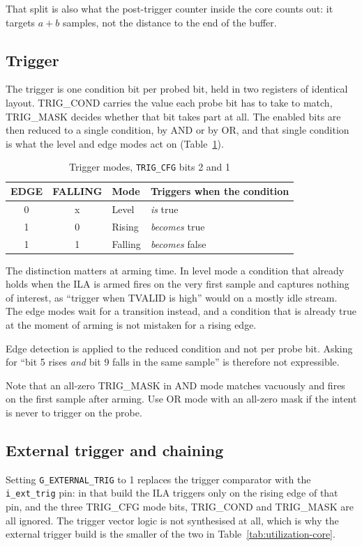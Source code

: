 \documentclass[twocolumn]{article}
\begin{document}
That split is also what the post-trigger counter inside the core counts out: it targets $a + b$ samples, not the distance to the end of the buffer.

\subsection{Trigger}
The trigger is one condition bit per probed bit, held in two registers of identical layout. TRIG\_COND carries the value each probe bit has to take to match, TRIG\_MASK decides whether that bit takes part at all. The enabled bits are then reduced to a single condition, by AND or by OR, and that single condition is what the level and edge modes act on (Table~\ref{tab:trigmodes}).

\begin{table}[H]
    \centering
    \begin{tabular}{|c|c|l|l|}
        \hline
        \rowcolor{gray!40} \textbf{EDGE} & \textbf{FALLING} & \textbf{Mode} & \textbf{Triggers when the condition} \\
        \hline
        0 & x & Level   & \emph{is} true \\
        \hline
        1 & 0 & Rising  & \emph{becomes} true \\
        \hline
        1 & 1 & Falling & \emph{becomes} false \\
        \hline
    \end{tabular}
    \caption{Trigger modes, \texttt{TRIG\_CFG} bits 2 and 1}
    \label{tab:trigmodes}
\end{table}

The distinction matters at arming time. In level mode a condition that already holds when the \acs{ILA} is armed fires on the very first sample and captures nothing of interest, as ``trigger when TVALID is high'' would on a mostly idle stream. The edge modes wait for a transition instead, and a condition that is already true at the moment of arming is not mistaken for a rising edge.

Edge detection is applied to the reduced condition and not per probe bit. Asking for ``bit 5 rises \emph{and} bit 9 falls in the same sample'' is therefore not expressible.

Note that an all-zero TRIG\_MASK in AND mode matches vacuously and fires on the first sample after arming. Use OR mode with an all-zero mask if the intent is never to trigger on the probe.

\subsection{External trigger and chaining}
Setting \texttt{G\_EXTERNAL\_TRIG} to 1 replaces the trigger comparator with the \texttt{i\_ext\_trig} pin: in that build the \acs{ILA} triggers only on the rising edge of that pin, and the three TRIG\_CFG mode bits, TRIG\_COND and TRIG\_MASK are all ignored. The trigger vector logic is not synthesised at all, which is why the external trigger build is the smaller of the two in Table~\ref{tab:utilization-core}.
\end{document}
